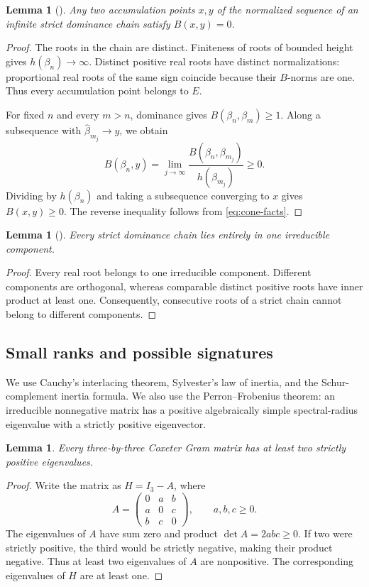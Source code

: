 \documentclass[11pt,reqno]{amsart}
\theoremstyle{plain}
\newtheorem{lemma}[theorem]{Lemma}
\theoremstyle{definition}
\theoremstyle{remark}
\numberwithin{equation}{section}
\begin{document}
\begin{lemma}[{\cite[Lemma ~4.1]{FuEtAl2026}}]\label{lem:orthogonality}
Any two accumulation points $x,y$ of the normalized sequence of an infinite strict dominance chain satisfy $B(x,y)=0$.
\end{lemma}
\begin{proof}
The roots in the chain are distinct. Finiteness of roots of bounded height gives $h(\beta_n)\to\infty$. Distinct positive real roots have distinct normalizations: proportional real roots of the same sign coincide because their $B$-norms are one. Thus every accumulation point belongs to $E$.

For fixed $n$ and every $m>n$, dominance gives $B(\beta_n,\beta_m)\geq1$. Along a subsequence with $\widehat{\beta}_{m_j}\to y$, we obtain
\[
B(\beta_n,y)=\lim_{j\to\infty}
\frac{B(\beta_n,\beta_{m_j})}{h(\beta_{m_j})}\geq0.
\]
Dividing by $h(\beta_n)$ and taking a subsequence converging to $x$ gives $B(x,y)\geq0$. The reverse inequality follows from \eqref{eq:cone-facts}.
\end{proof}

\begin{lemma}[{\cite[Proposition 4.6]{FuEtAl2026}}]\label{lem:components}
Every strict dominance chain lies entirely in one irreducible component.
\end{lemma}
\begin{proof}
Every real root belongs to one irreducible component. Different components are orthogonal, whereas comparable distinct positive roots have inner product at least one. Consequently, consecutive roots of a strict chain cannot belong to different components.
\end{proof}

\subsection{Small ranks and possible signatures}

We use Cauchy's interlacing theorem, Sylvester's law of inertia, and the Schur-complement inertia formula. We also use the Perron--Frobenius theorem: an irreducible nonnegative matrix has a positive algebraically simple spectral-radius eigenvalue with a strictly positive eigenvector.

\begin{lemma}\label{lem:three-positive}
Every three-by-three Coxeter Gram matrix has at least two strictly positive eigenvalues.
\end{lemma}
\begin{proof}
Write the matrix as $H=I_3-A$, where
\[
A=\begin{pmatrix}0&a&b\\a&0&c\\b&c&0\end{pmatrix},\qquad a,b,c\geq0.
\]
The eigenvalues of $A$ have sum zero and product $\det A=2abc\geq0$. If two were strictly positive, the third would be strictly negative, making their product negative. Thus at least two eigenvalues of $A$ are nonpositive. The corresponding eigenvalues of $H$ are at least one.
\end{proof}
\end{document}
